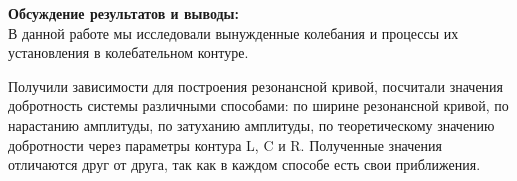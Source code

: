 \documentclass[a4paper, 12pt]{article}%
\begin{document}
	
	\textbf{Обсуждение результатов и выводы: }\\
	
	В данной работе мы исследовали вынужденные колебания и процессы их установления в колебательном контуре.
	
	Получили зависимости для построения резонансной кривой, посчитали значения добротность системы различными способами: по ширине резонансной кривой, по нарастанию амплитуды, по затуханию амплитуды, по теоретическому значению добротности через параметры
	контура L, C и R. Полученные значения отличаются друг от друга, так как в каждом способе есть свои приближения.
	
	
	
	
	
	
	
	
\end{document}
